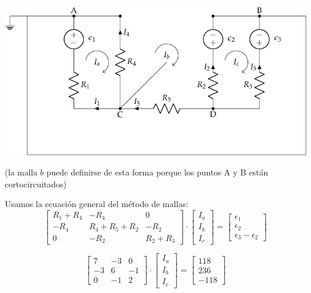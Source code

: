 \begin{center}            
    \includegraphics{figuras/mallas_condensadores_sol.pdf}
\end{center}
(la malla $b$ puede definirse de esta forma porque los puntos A y B están cortocircuitados)

\vspace{4mm}
Usamos la ecuación general del método de mallas:    
\begin{equation*}
    \begin{bmatrix}
        R_1 + R_4 & -R_4 & 0\\
        -R_4 & R_4 + R_5 + R_2 & -R_{2}\\
        0 & -R_2 & R_2 + R_3
    \end{bmatrix} \cdot %
    \begin{bmatrix}
        I_{a}\\
        I_{b}\\
        I_{c}
    \end{bmatrix} = %
    \begin{bmatrix}
        \epsilon_1\\
        \epsilon_2\\
        \epsilon_3 - \epsilon_2
    \end{bmatrix}
\end{equation*} 

\begin{equation*}
    \begin{bmatrix}
        7 & -3 & 0\\
        -3 & 6 & -1\\
        0 & -1 & 2
    \end{bmatrix} \cdot %
    \begin{bmatrix}
        I_{a}\\
        I_{b}\\
        I_{c}
    \end{bmatrix} = %
    \begin{bmatrix}
        118\\
        236\\
        -118
    \end{bmatrix}
\end{equation*}  

